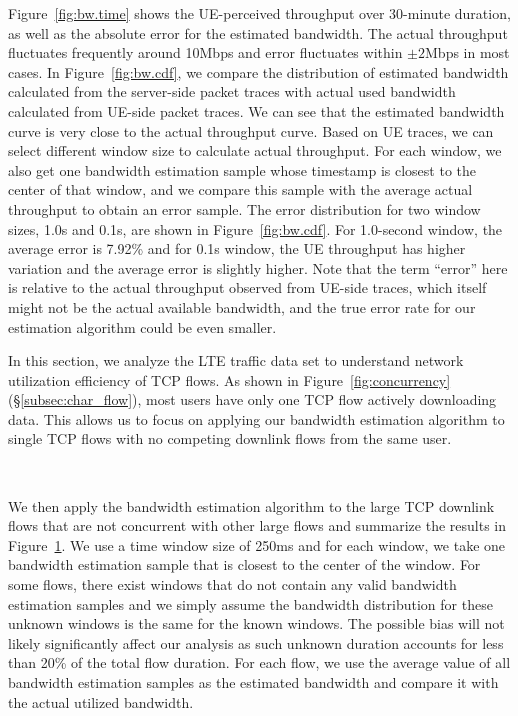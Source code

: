 Figure~\ref{fig:bw.time} shows the UE-perceived throughput over 30-minute duration, as well as the absolute error for the estimated bandwidth. The actual throughput fluctuates frequently around 10Mbps and error fluctuates within $\pm2$Mbps in most cases. In Figure~\ref{fig:bw.cdf}, we compare the distribution of estimated bandwidth calculated from the server-side packet traces with actual used bandwidth calculated from UE-side packet traces. We can see that the estimated bandwidth curve is very close to the actual throughput curve. Based on UE traces, we can select different window size to calculate actual throughput. For each window, we also get one bandwidth estimation sample whose timestamp is closest to the center of that window, and we compare this sample with the average actual throughput to obtain an error sample. The error distribution for two window sizes, \ie 1.0s and 0.1s, are shown in Figure~\ref{fig:bw.cdf}. For 1.0-second window, the average error is 7.92\% and for 0.1s window, the UE throughput has higher variation and the average error is slightly higher. Note that the term ``error'' here is relative to the actual throughput observed from UE-side traces, which itself might not be the actual available bandwidth, and the true error rate for our estimation algorithm could be even smaller.


In this section, we analyze the LTE traffic data set to understand network utilization efficiency of TCP flows.
As shown in Figure~\ref{fig:concurrency} (\S\ref{subsec:char_flow}), most users have only one TCP flow actively downloading data. This allows us to 
focus on applying our bandwidth estimation algorithm to single TCP flows with no competing downlink flows from the same user.

\begin{figure}[t]
\centering
{}\\
\label{fig:bwe}
\end{figure}

We then apply the bandwidth estimation algorithm to the large TCP downlink flows that are not concurrent with other large flows and summarize the results in Figure~\ref{fig:bwe}. We use a time window size of 250ms and for each window, we take one bandwidth estimation sample that is closest to the center of the window. For some flows, there exist windows that do not contain any valid bandwidth estimation samples and we simply assume the bandwidth distribution for these unknown windows is the same for the known windows. The possible bias will not likely significantly affect our analysis as such unknown duration accounts for less than 20\% of the total flow duration. For each flow, we use the average value of all bandwidth estimation samples as the estimated bandwidth and compare it with the actual utilized bandwidth.

